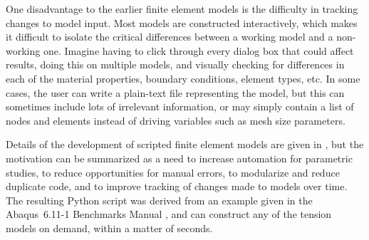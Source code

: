 
One disadvantage to the earlier finite element models is the difficulty in tracking changes to model input.
Most models are constructed interactively, which makes it difficult to isolate the critical differences between a working model and a non-working one.
Imagine having to click through every dialog box that could affect results, doing this on multiple models, and visually checking for differences in each of the material properties, boundary conditions, element types, etc.
In some cases, the user can write a plain-text file representing the model, but this can sometimes include lots of irrelevant information, or may simply contain a list of nodes and elements instead of driving variables such as mesh size parameters.

Details of the development of scripted finite element models are given in , but the motivation can be summarized as a need to increase automation for parametric studies, to reduce opportunities for manual errors, to modularize and reduce duplicate code, and to improve tracking of changes made to models over time.
The resulting Python script was derived from an example given in the Abaqus~6.11-1 Benchmarks Manual \citeyearpar{abaqus-611-benchmarks-manual}, and can construct any of the tension models on demand, within a matter of seconds.

